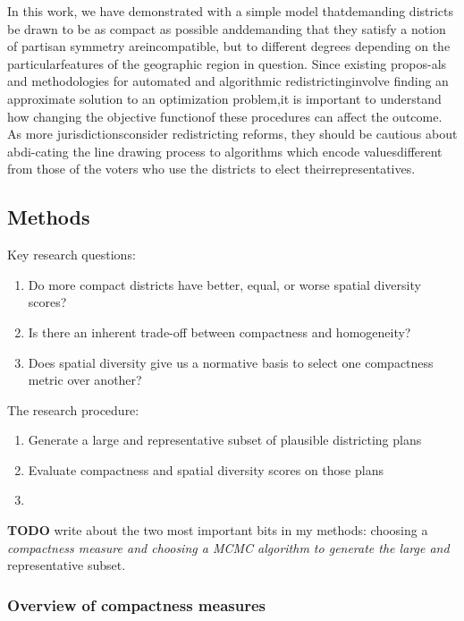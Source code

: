 \documentclass[]{article}
\providecommand{\tightlist}{%
  \setlength{\itemsep}{0pt}\setlength{\parskip}{0pt}}
\begin{document}
In this work, we have demonstrated with a simple model thatdemanding
districts be drawn to be as compact as possible anddemanding that they
satisfy a notion of partisan symmetry areincompatible, but to different
degrees depending on the particularfeatures of the geographic region in
question. Since existing propos-als and methodologies for automated and
algorithmic redistrictinginvolve finding an approximate solution to an
optimization problem,it is important to understand how changing the
objective functionof these procedures can affect the outcome. As more
jurisdictionsconsider redistricting reforms, they should be cautious
about abdi-cating the line drawing process to algorithms which encode
valuesdifferent from those of the voters who use the districts to elect
theirrepresentatives.

\hypertarget{methods}{%
\subsection{Methods}\label{methods}}

Key research questions:

\begin{enumerate}
\def\labelenumi{\arabic{enumi}.}
\tightlist
\item
  Do more compact districts have better, equal, or worse spatial
  diversity scores?
\item
  Is there an inherent trade-off between compactness and homogeneity?
\item
  Does spatial diversity give us a normative basis to select one
  compactness metric over another?
\end{enumerate}

The research procedure:

\begin{enumerate}
\def\labelenumi{\arabic{enumi}.}
\item
  Generate a large and representative subset of plausible districting
  plans
\item
  Evaluate compactness and spatial diversity scores on those plans
\item
\end{enumerate}

\textbf{TODO} write about the two most important bits in my methods:
choosing a \emph{compactness measure and choosing a MCMC algorithm to
generate the large and }representative subset.

\hypertarget{overview-of-compactness-measures}{%
\subsubsection{Overview of compactness
measures}\label{overview-of-compactness-measures}}
\end{document}
